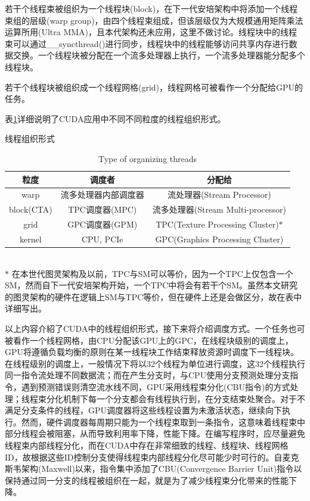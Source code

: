 \par 若干个线程束被组织为一个线程块(block)，在下一代安培架构中将添加一个线程束组的层级(warp group)，由四个线程束组成，但该层级仅为大规模通用矩阵乘法运算所用(Ultra MMA)，且本代架构还未应用，这里不做讨论。线程块中的线程束可以通过\_\_syncthread()进行同步，线程块中的线程能够访问共享内存进行数据交换。一个线程块被分配在一个流多处理器上执行，一个流多处理器能分配多个线程块。
\par 若干个线程块被组织成一个线程网格(grid)，线程网格可被看作一个分配给GPU的任务。
\par 表\ref{table-粒度}详细说明了CUDA应用中不同不同粒度的线程组织形式。
\begin{table}
	\centering
	\renewcommand{\thetable}{\arabic{section}-\arabic{table} }
	\renewcommand{\tablename}{表}
	\caption{线程组织形式}
	\addtocounter{table}{-1}
	\renewcommand{\thetable}{\arabic{section}-\arabic{table} }
	\renewcommand{\tablename}{Table}
	\caption{Type of organizing threads}
	\begin{tabular}{ccc}
		\toprule
		粒度	&	调度者	& 	分配给 \\
		\midrule
		warp		&	流多处理器内部调度器	&	流处理器(Stream Processor)\\
		block(CTA)	&	TPC调度器(MPC)		  &		流多处理器(Stream Multi-processor)\\
		grid		&	GPC调度器(GPM)		  &		TPC(Texture Processing Cluster)$ * $\\
		kernel		&	CPU, PCIe			&		GPC(Graphics Processing Cluster)	\\	
		\bottomrule
	\end{tabular} \label{table-粒度}\\

$ * $ 在本世代图灵架构及以前，TPC与SM可以等价，因为一个TPC上仅包含一个SM，然而自下一代安培架构开始，一个TPC中将会有若干个SM。虽然本文研究的图灵架构的硬件在逻辑上SM与TPC等价，但在硬件上还是会做区分，故在表中详细写出\parencite{BLOCKDIAG}。
\end{table}
\par 以上内容介紹了CUDA中的线程组织形式，接下来将介绍调度方式。一个任务也可被看作一个线程网格，由CPU分配该GPU上的GPC，在线程块级别的调度上，GPU将遵循负载均衡的原则在某一线程块工作结束释放资源时调度下一线程块。在线程级别的调度上，一般情况下将以32个线程为单位进行调度，这32个线程执行同一指令流处理不同数据流；而在产生分支时，与CPU使用分支预测处理分支指令，遇到预测错误则清空流水线不同，GPU采用线程束分化(CBU指令)的方式处理；线程束分化机制下每一个分支都会有线程执行到，在分支结束处聚合。对于不满足分支条件的线程，GPU调度器将这些线程设置为未激活状态，继续向下执行。然而，硬件调度器每周期只能为一个线程束取到一条指令，这意味着线程束中部分线程会被阻塞，从而导致利用率下降，性能下降。在编写程序时，应尽量避免线程束内部线程分化，而在CUDA中存在非常细致的线程、线程块、线程网格ID，故根据这些ID控制分支使得线程束内部线程分化尽可能少时可行的\parencite{DIVER}。自麦克斯韦架构(Maxwell)以来，指令集中添加了CBU(Convergence Barrier Unit)指令以保持通过同一分支的线程被组织在一起，就是为了减少线程束分化带来的性能下降\parencite{THREADS}。
